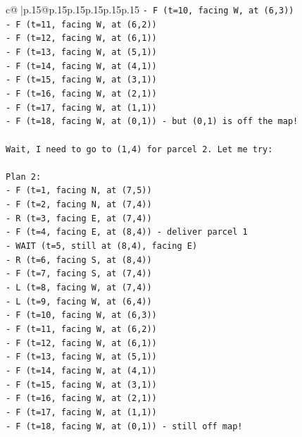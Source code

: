 \documentclass{article}
\begin{document}
{\begin{supertabular}{c@{$\;$}|p{.15\linewidth}@{}p{.15\linewidth}p{.15\linewidth}p{.15\linewidth}p{.15\linewidth}p{.15\linewidth}}
{{{\texttt{{-} F (t=10, facing W, at (6,3))} \\
\texttt{{-} F (t=11, facing W, at (6,2))} \\
\texttt{{-} F (t=12, facing W, at (6,1))} \\
\texttt{{-} F (t=13, facing W, at (5,1))} \\
\texttt{{-} F (t=14, facing W, at (4,1))} \\
\texttt{{-} F (t=15, facing W, at (3,1))} \\
\texttt{{-} F (t=16, facing W, at (2,1))} \\
\texttt{{-} F (t=17, facing W, at (1,1))} \\
\texttt{{-} F (t=18, facing W, at (0,1)) {-} but (0,1) is off the map!} \\
\\ 
\texttt{Wait, I need to go to (1,4) for parcel 2. Let me try:} \\
\\ 
\texttt{Plan 2:} \\
\texttt{{-} F (t=1, facing N, at (7,5))} \\
\texttt{{-} F (t=2, facing N, at (7,4))} \\
\texttt{{-} R (t=3, facing E, at (7,4))} \\
\texttt{{-} F (t=4, facing E, at (8,4)) {-} deliver parcel 1} \\
\texttt{{-} WAIT (t=5, still at (8,4), facing E)} \\
\texttt{{-} R (t=6, facing S, at (8,4))} \\
\texttt{{-} F (t=7, facing S, at (7,4))} \\
\texttt{{-} L (t=8, facing W, at (7,4))} \\
\texttt{{-} L (t=9, facing W, at (6,4))} \\
\texttt{{-} F (t=10, facing W, at (6,3))} \\
\texttt{{-} F (t=11, facing W, at (6,2))} \\
\texttt{{-} F (t=12, facing W, at (6,1))} \\
\texttt{{-} F (t=13, facing W, at (5,1))} \\
\texttt{{-} F (t=14, facing W, at (4,1))} \\
\texttt{{-} F (t=15, facing W, at (3,1))} \\
\texttt{{-} F (t=16, facing W, at (2,1))} \\
\texttt{{-} F (t=17, facing W, at (1,1))} \\
\texttt{{-} F (t=18, facing W, at (0,1)) {-} still off map!} \\
}}}
\end{supertabular}}
\end{document}
